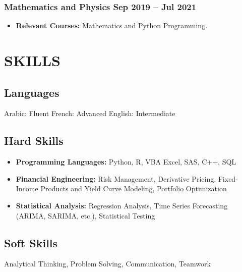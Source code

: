 \documentclass[11pt]{amdresume}
\begin{document}
\subsubsection{Mathematics and Physics \dotfill Sep 2019 – Jul 2021}
\begin{itemize}
\item \textbf{Relevant Courses:} Mathematics and Python Programming.
\end{itemize}


\section{SKILLS}

\subsection{Languages}
Arabic: Fluent \hfill French: Advanced \hfill English: Intermediate \hspace{2cm}

\subsection{Hard Skills}
\begin{itemize}
\item \textbf{Programming Languages:} Python, R, VBA Excel, SAS, C++, SQL
\item \textbf{Financial Engineering:} Risk Management, Derivative Pricing, Fixed-Income Products and Yield Curve Modeling, Portfolio Optimization
\item \textbf{Statistical Analysis:} Regression Analysis, Time Series Forecasting (ARIMA, SARIMA, etc.), Statistical Testing
\end{itemize}

\subsection{Soft Skills}
Analytical Thinking, Problem Solving, Communication, Teamwork
\end{document}
